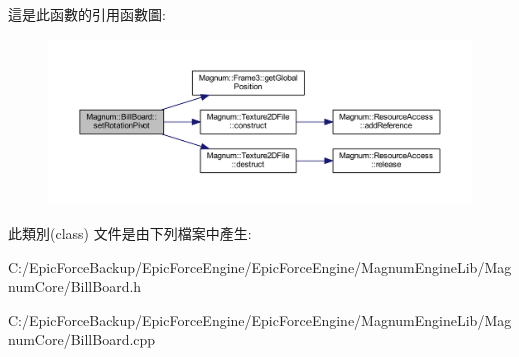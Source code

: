 這是此函數的引用函數圖\+:\nopagebreak
\begin{figure}[H]
\begin{center}
\leavevmode
\includegraphics[width=350pt]{class_magnum_1_1_bill_board_adf4d1c65adcbf8b3ad6767aaa0b18fb5_cgraph}
\end{center}
\end{figure}




此類別(class) 文件是由下列檔案中產生\+:\begin{DoxyCompactItemize}
\item 
C\+:/\+Epic\+Force\+Backup/\+Epic\+Force\+Engine/\+Epic\+Force\+Engine/\+Magnum\+Engine\+Lib/\+Magnum\+Core/Bill\+Board.\+h\item 
C\+:/\+Epic\+Force\+Backup/\+Epic\+Force\+Engine/\+Epic\+Force\+Engine/\+Magnum\+Engine\+Lib/\+Magnum\+Core/Bill\+Board.\+cpp\end{DoxyCompactItemize}
